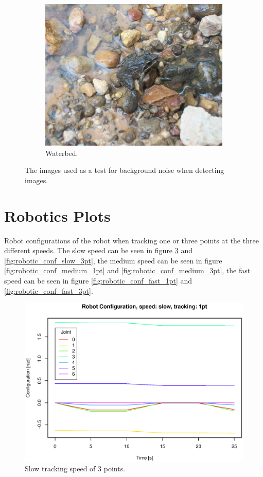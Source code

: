 \begin{figure}[h]
  \begin{subfigure}{0.43\linewidth}  \includegraphics[width=\linewidth]{graphics/texture3} \caption{Waterbed.}         \label{fig:scene_waterb} \end{subfigure}
  \caption{The images used as a test for background noise when detecting images.}
  \label{fig:backgrounds}
\end{figure}

\section{Robotics Plots}
\label{app:roboticsPlots}

Robot configurations of the robot when tracking one or three points at the three different speeds.
The slow speed can be seen in figure \ref{fig:robotic_conf_slow_1pt} and \ref{fig:robotic_conf_slow_3pt}, 
the medium speed can be seen in figure \ref{fig:robotic_conf_medium_1pt} and \ref{fig:robotic_conf_medium_3pt},
the fast speed can be seen in figure \ref{fig:robotic_conf_fast_1pt} and \ref{fig:robotic_conf_fast_3pt}.

\begin{figure}[H]
\centering
\includegraphics[width= \linewidth]{graphics/robotics/robotConfiguration_slow_1pt}
\caption{Slow tracking speed of 3 points.}
\label{fig:robotic_conf_slow_1pt}
\end{figure}


